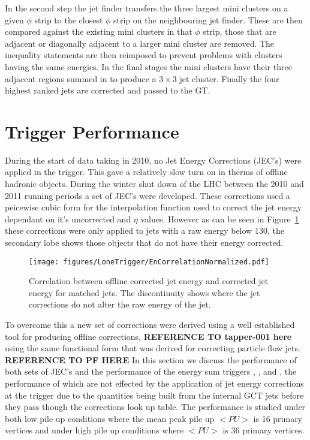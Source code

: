 In the second step the jet finder transfers the three largest mini clusters on 
a given $\phi$ strip to the closest $\phi$ strip on the neighbouring jet finder.
These are then compared against the existing mini clusters in that $\phi$ strip,
those that are adjacent or diagonally adjacent to a larger mini cluster are 
removed. The inequality statements are then reimposed to prevent problems
with clusters having the same energies. In the final stages the mini clusters
have their three adjacent regions summed in to produce a $3 \times 3$ jet
cluster. Finally the four highest ranked jets are corrected and passed to the 
GT.

\section{\Lone Trigger Performance} %

During the start of data taking in 2010, no Jet Energy Corrections (JEC's) were 
applied in the \Lone trigger. This gave a relatively slow turn on in therms of 
offline hadronic objects.
During the winter shut down of the LHC between the 2010 and 2011 running 
periods a set of \Lone JEC's were developed. These corrections used a peicewise 
cubic form for the interpolation function used to correct the jet energy 
dependant on it's uncorrected \ET and $\eta$ values. However as can be seen in
Figure~\ref{fig:figures_LoneTrigger_EnCorrelationNormalized} these corrections 
were only applied to jets with a raw energy below \unit{130}{\GeV}, the secondary lobe shows those objects that do not have their energy corrected.

\begin{figure}[htbp]
  \centering
    \texttt{[image: figures/LoneTrigger/EnCorrelationNormalized.pdf]}
  \caption{Correlation between offline corrected jet energy and \Lone corrected jet energy for matched jets. The discontinuity shows where the \Lone jet corrections do not alter the raw energy of the jet.}
  \label{fig:figures_LoneTrigger_EnCorrelationNormalized}
\end{figure}

To overcome this a new set of corrections were derived using a well established 
tool for producing offline corrections, \textbf{REFERENCE TO tapper-001 here} 
using the same functional form that was derived for correcting particle flow 
jets. \textbf{REFERENCE TO PF HERE}
In this section we discuss the performance of both sets of \Lone JEC's and the 
performance of the energy sum triggers \HT, \HTm, and \MET, the performance of 
which are not effected by the application of jet energy corrections at the 
\Lone trigger due to the quantities being built from the internal GCT jets 
before they pass though the corrections look up table.
The performance is studied under both low pile up conditions where the mean 
peak pile up $<PU>$ is 16 primary vertices and under high pile up conditions 
where $<PU>$ is 36 primary vertices.

